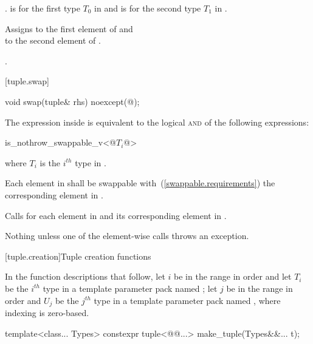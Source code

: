 \begin{itemdescr}
\pnum
\requires {}.
 is  for the first type $T_0$ in
 and  is  for the second
type $T_1$ in .

\pnum
\effects Assigns  to the first
element of  and\\  to the
second element of .

\pnum
\returns {}.
\end{itemdescr}

[tuple.swap]{}

%
\begin{itemdecl}
void swap(tuple& rhs) noexcept(@\seebelow@);
\end{itemdecl}

\begin{itemdescr}
\pnum
\remark The expression inside  is equivalent to the logical
\textsc{and} of the following expressions:

\begin{codeblock}
is_nothrow_swappable_v<@$T_i$@>
\end{codeblock}

where $T_i$ is the $i^{th}$ type in .

\pnum
\requires
Each element in  shall be swappable with~(\ref{swappable.requirements})
the corresponding element in .

\pnum
\effects Calls  for each element in  and its
corresponding element in .

\pnum
\throws Nothing unless one of the element-wise  calls throws an exception.
\end{itemdescr}

[tuple.creation]{Tuple creation functions}

\pnum
In the function descriptions that follow, let $i$ be in the range 
in order and let $T_i$ be the $i^{th}$ type in a template parameter pack named ;
let $j$ be in the range  in order and $U_j$ be the $j^{th}$ type
in a template parameter pack named , where indexing is zero-based.

%
%
\begin{itemdecl}
template<class... Types>
  constexpr tuple<@@...> make_tuple(Types&&... t);
\end{itemdecl}

